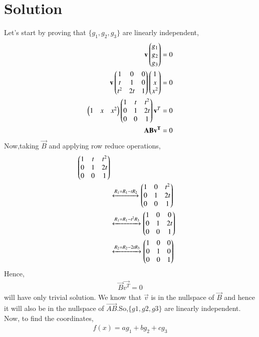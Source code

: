 \documentclass[journal,12pt,twocolumn]{IEEEtran}
\begin{document}
   \section{\textbf{Solution}}
  Let's start by proving that $\{g_1,g_2,g_3\}$ are linearly independent,
    \begin{align}
    \mathbf{v}\begin{pmatrix}g_1\\g_2\\g_3\end{pmatrix}=0\\
    \mathbf{v}\begin{pmatrix}1&0&0\\t&1&0\\t^2&2t&1\end{pmatrix}\begin{pmatrix}1\\x\\x^2\end{pmatrix}=0\\
    \begin{pmatrix}1&x&x^2\end{pmatrix}\begin{pmatrix}1&t&t^2\\0&1&2t\\0&0&1\end{pmatrix}\mathbf{v}^T=0\\
    \mathbf{ABv^T}=0
    \end{align}
    Now,taking $\vec{B}$ and applying row reduce operations,
    \begin{align}
    \begin{pmatrix}1&t&t^2\\0&1&2t\\0&0&1\end{pmatrix}\\
    &\xleftrightarrow{R_1 = R_1-tR_2}\begin{pmatrix}1&0&t^2\\0&1&2t\\0&0&1\end{pmatrix}\\
    &\xleftrightarrow{R_1 = R_1-t^2R_3}\begin{pmatrix}1&0&0\\0&1&2t\\0&0&1\end{pmatrix}\\
     &\xleftrightarrow{R_2 = R_2-2tR_3}\begin{pmatrix}1&0&0\\0&1&0\\0&0&1\end{pmatrix}
    \end{align}
    Hence, 
    \begin{align}
    \vec{B}\vec{v^T}=0
    \end{align}
    will have only trivial solution.
 We know that $\vec{v}$ is in the nullspace of $\vec{B}$ and hence it will also be in the nullspace of $\vec{AB}$.So,$\{g1,g2,g3\}$ are linearly independent.  Now, to find the coordinates,
  \begin{align}
  f(x)=ag_1+bg_2+cg_3
  \end{align}
\end{document}
